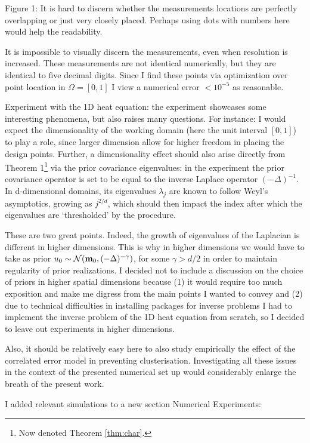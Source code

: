 \RC Figure 1: It is hard to discern whether the measurements locations
are perfectly overlapping or just very closely placed. Perhaps using
dots with numbers here would help the readability.
  
\AR It is impossible to visually discern the measurements, even when
resolution is increased. These measurements are not identical
numerically, but they are identical to five decimal digits. Since I
find these points via optimization over point location in
$\Omega=[0,1]$ I view a numerical error $<10^{-5}$ as reasonable.

\RC Experiment with the 1D heat equation: the experiment showcases
some interesting phenomena, but also raises many questions. For
instance: I would expect the dimensionality of the working domain
(here the unit interval $[0, 1]$) to play a role, since larger
dimension allow for higher freedom in placing the design points.
Further, a dimensionality effect should also arise directly from
Theorem 1\footnote{Now denoted Theorem \ref{thm:char}.} via the prior
covariance eigenvalues: in the experiment the prior covariance
operator is set to be equal to the inverse Laplace operator
$(-\Delta)^{-1}$. In d-dimensional domains, its eigenvalues
$\lambda_j$ are known to follow Weyl’s asymptotics, growing as
$j^{2/d}$, which should then impact the index after which the
eigenvalues are ‘thresholded’ by the procedure.

\AR These are two great points. Indeed, the growth of eigenvalues of
the Laplacian is different in higher dimensions. This is why in higher
dimensions we would have to take as prior \(u_0 \sim
\mathcal{N}(\mathbf{m}_0, (-\Delta)^{-\gamma})\), for some \(\gamma >
d/2\) in order to maintain regularity of prior realizations. I decided
not to include a discussion on the choice of priors in higher spatial
dimensions because (1) it would require too much exposition and make
me digress from the main points I wanted to convey and (2) due to
technical difficulties in installing packages for inverse problems
\cite{attia2023pyoed, villa2021} I had to implement the inverse
problem of the 1D heat equation from scratch, so I decided to leave
out experiments in higher dimensions.

  
\RC Also, it should be relatively easy here to also study empirically
the effect of the correlated error model in preventing
clusterisation. Investigating all these issues in the context of the
presented numerical set up would considerably enlarge the breath of
the present work.

\AR I added relevant simulations to a new section Numerical
Experiments:


